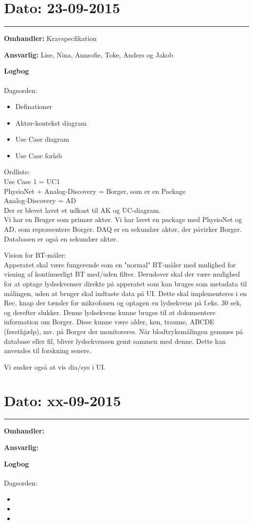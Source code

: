 \section{Dato: 23-09-2015 }
\hrule

\textbf{Omhandler:} Kravspecfikation 

\textbf{Ansvarlig:} Lise, Nina, Annsofie, Toke, Anders og Jakob

\textbf{Logbog}
\\
\\
Dagsorden:
\begin{itemize}
	\item Definationer
	\item Aktør-kontekst diagram
	\item Use Case diagram
	\item Use Case forløb
\end{itemize}

Ordliste:\\ 
Use Case 1 = UC1 \\
PhysioNet + Analog-Discovery = Borger, som er en Package \\
Analog-Discovery = AD \\


Der er blevet lavet et udkast til AK og UC-diagram. \\
Vi har en Bruger som primær aktør. Vi har lavet en package med PhysioNet og AD, som repræsentere Borger. DAQ er en sekundær aktør, der påvirker Borger. Databasen er også en sekundær aktør. 


Vision for BT-måler:\\
Apperatet skal være fungerende som en "normal" BT-måler med mulighed for visning af kontinuerligt BT med/uden filter. Derudover skal der være mulighed for at optage lydsekvenser direkte på apperatet som kan bruges som metadata til målingen, uden at bruger skal indtaste data på UI. Dette skal implementeres i en Rec. knap der tænder for mikrofonen og optagen en lydsekvens på f.eks. 30 sek, og derefter slukker. Denne lydsekvens kunne bruges til at dokumentere information om Borger. Disse kunne være alder, køn, traume, ABCDE (førsthjælp), mv. på Borger der monitoreres. 
Når blodtryksmålingen gemmes på database eller fil, bliver lydsekvensen gemt sammen med denne. Dette kan anvendes til forskning senere. 


Vi ønsker også at vis dia/sys i UI. 


\section{Dato: xx-09-2015 }
\hrule

\textbf{Omhandler:}  

\textbf{Ansvarlig:} 

\textbf{Logbog}
\\
\\
Dagsorden:
\begin{itemize}
	\item 
	\item 
	\item 
\end{itemize}